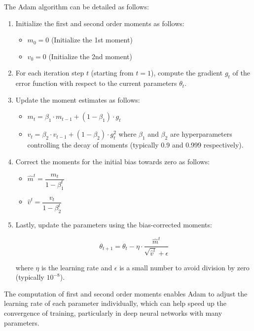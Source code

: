 The Adam algorithm can be detailed as follows:
\begin{enumerate}
    \item Initialize the first and second order moments as follows:
    \begin{itemize}
        \item $m_0=0$ (Initialize the 1st moment)
        \item $v_0=0$ (Initialize the 2nd moment)
    \end{itemize}
    \item For each iteration step $t$ (starting from $t=1$), compute the gradient $g_t$ of the error function with respect to the current parameters $\theta_t$.
    \item Update the moment estimates as follows:
    \begin{itemize}
        \item $m_t = \beta_1 \cdot m_{t-1} +(1-\beta_1) \cdot g_t$
        \item $v_t = \beta_2 \cdot v_{t-1} + (1-\beta_2) \cdot g_{t}^{2}$ 
        where $\beta_1$ and $\beta_2$ are hyperparameters controlling the decay of moments (typically 0.9 and 0.999 respectively).
    \end{itemize}
    \item Correct the moments for the initial bias towards zero as follows:
        \begin{itemize}
        \item $\hat{m}^t = \dfrac{m_t}{1 - \beta_{1}^{t}}$
        \item $\hat{v}^t = \dfrac{v_t}{1 - \beta_{2}^{t}}$
    \end{itemize}
    \item Lastly, update the parameters using the bias-corrected moments:

    $$\theta_{t+1} = \theta_t - \eta \cdot \dfrac{\hat{m}^t}{\sqrt{\hat{v}^t} + \epsilon}$$

where $\eta$ is the learning rate and $\epsilon$ is a small number to avoid division by zero (typically $10^{-8}$).
\end{enumerate}

The computation of first and second order moments enables Adam to adjust the learning rate of each parameter individually, which can help speed up the convergence of training, particularly in deep neural networks with many parameters.



